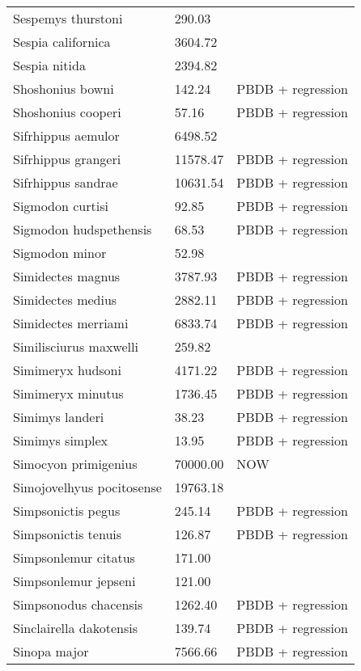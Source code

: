 \documentclass{article}
\begin{document}
\begin{center}
\begin{longtable}{p{} p{} p{} }
  Sespemys thurstoni & 290.03 & \cite{Tomiya2013} \\ 
  Sespia californica & 3604.72 & \cite{Tomiya2013} \\ 
  Sespia nitida & 2394.82 & \cite{VanValkenburgh2007a} \\ 
  Shoshonius bowni & 142.24 & PBDB + regression \\ 
  Shoshonius cooperi & 57.16 & PBDB + regression \\ 
  Sifrhippus aemulor & 6498.52 & \cite{Osborn1933} \\ 
  Sifrhippus grangeri & 11578.47 & PBDB + regression \\ 
  Sifrhippus sandrae & 10631.54 & PBDB + regression \\ 
  Sigmodon curtisi & 92.85 & PBDB + regression \\ 
  Sigmodon hudspethensis & 68.53 & PBDB + regression \\ 
  Sigmodon minor & 52.98 & \cite{Tomiya2013} \\ 
  Simidectes magnus & 3787.93 & PBDB + regression \\ 
  Simidectes medius & 2882.11 & PBDB + regression \\ 
  Simidectes merriami & 6833.74 & PBDB + regression \\ 
  Similisciurus maxwelli & 259.82 & \cite{Tomiya2013} \\ 
  Simimeryx hudsoni & 4171.22 & PBDB + regression \\ 
  Simimeryx minutus & 1736.45 & PBDB + regression \\ 
  Simimys landeri & 38.23 & PBDB + regression \\ 
  Simimys simplex & 13.95 & PBDB + regression \\ 
  Simocyon primigenius & 70000.00 & NOW \\ 
  Simojovelhyus pocitosense & 19763.18 & \cite{Wang1999} \\ 
  Simpsonictis pegus & 245.14 & PBDB + regression \\ 
  Simpsonictis tenuis & 126.87 & PBDB + regression \\ 
  Simpsonlemur citatus & 171.00 & \cite{Soligo2006} \\ 
  Simpsonlemur jepseni & 121.00 & \cite{Soligo2006} \\ 
  Simpsonodus chacensis & 1262.40 & PBDB + regression \\ 
  Sinclairella dakotensis & 139.74 & PBDB + regression \\ 
  Sinopa major & 7566.66 & PBDB + regression \\ 

\end{longtable}
\end{center}
\end{document}
